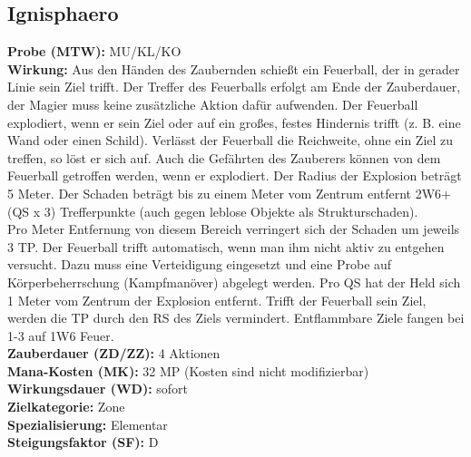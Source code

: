 \subsection{Ignisphaero}
\label{chap:ignisphaero}
\textbf{Probe (MTW):} MU/KL/KO \\
\textbf{Wirkung:} Aus den Händen des Zaubernden schießt ein Feuerball, der in gerader Linie sein Ziel trifft. Der Treffer des Feuerballs erfolgt am Ende der Zauberdauer, der Magier muss keine zusätzliche Aktion dafür aufwenden. Der Feuerball explodiert, wenn er sein Ziel oder auf ein großes, festes Hindernis trifft (z. B. eine Wand oder einen Schild). Verlässt der Feuerball die Reichweite, ohne ein Ziel zu treffen, so löst er sich auf. Auch die Gefährten des Zauberers können von dem Feuerball getroffen werden, wenn er explodiert. Der Radius der Explosion beträgt 5 Meter. Der Schaden beträgt bis zu einem Meter vom Zentrum entfernt 2W6+(QS x 3) Trefferpunkte (auch gegen leblose Objekte als Strukturschaden).\\
Pro Meter Entfernung von diesem Bereich verringert sich der Schaden um jeweils 3 TP. Der Feuerball trifft automatisch, wenn man ihm nicht aktiv zu entgehen versucht. Dazu muss eine Verteidigung eingesetzt und eine Probe auf Körperbeherrschung (Kampfmanöver) abgelegt werden. Pro QS hat der Held sich 1 Meter vom Zentrum der Explosion entfernt. Trifft der Feuerball sein Ziel, werden die TP durch den RS des Ziels vermindert. Entflammbare Ziele fangen bei 1-3 auf 1W6 Feuer. \\
\textbf{Zauberdauer (ZD/ZZ):} 4 Aktionen \\
\textbf{Mana-Kosten (MK):} 32 MP (Kosten sind nicht modifizierbar) \\
\textbf{Wirkungsdauer (WD):} sofort \\
\textbf{Zielkategorie:} Zone \\
\textbf{Spezialisierung:} Elementar \\
\textbf{Steigungsfaktor (SF):} D


